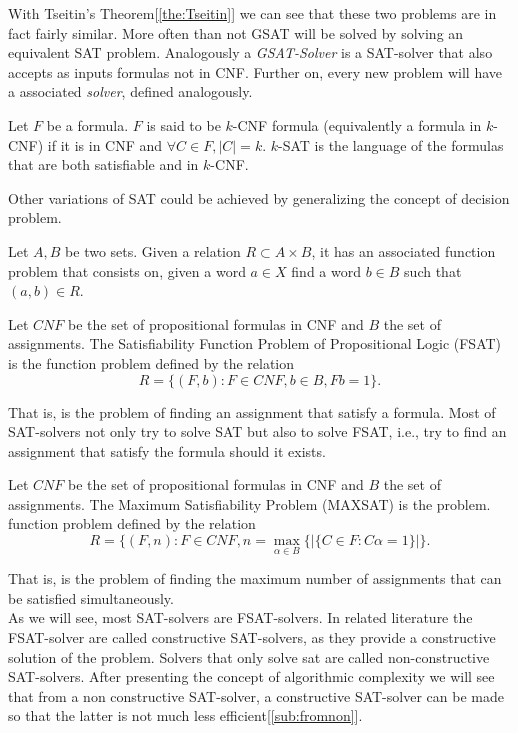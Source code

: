 With Tseitin's Theorem[\ref{the:Tseitin}] we can see that these two problems are in fact fairly similar. More often than not GSAT will be solved by solving an equivalent SAT problem. Analogously a \emph{GSAT-Solver}  is a SAT-solver that also accepts as inputs formulas not in CNF. Further on, every new problem will have a associated \emph{solver}, defined analogously.



\begin{definition}
  Let $F$ be a formula. $F$ is said to be $k$-CNF formula (equivalently a formula in $k$-CNF) if it is in CNF and $\forall C \in F, |C| = k$. $k$-SAT is the language of the formulas that are both satisfiable and in $k$-CNF.
\end{definition}

Other variations of SAT could be achieved by generalizing the concept of decision problem.

\begin{definition}
  Let $A,B$ be two sets. Given a relation $R\subset A\times B$, it has an associated function problem that consists on, given a word $a\in X$ find a word $b\in B$ such that $(a,b)\in R$.
\end{definition}

\begin{definition}
  Let $CNF$ be the set of propositional formulas in CNF and $B$ the set of assignments.  The Satisfiability Function Problem of Propositional Logic (FSAT) is the function problem defined by the relation $$R=\{(F, b): F\in CNF, b \in B, Fb = 1\}.$$
\end{definition}
That is, is the problem of finding an assignment that satisfy a formula. Most of SAT-solvers not only try to solve SAT but also to solve FSAT, i.e., try to find an assignment that satisfy  the formula should it exists.
\begin{definition}
  Let $CNF$ be the set of propositional formulas in CNF and $B$ the set of assignments. The Maximum Satisfiability Problem (MAXSAT) is the problem. function problem defined by the relation $$R=\{(F,n) : F\in CNF, n = \max_{\alpha \in B}\{ | \{C\in F : C\alpha =1 \}| \}.$$
\end{definition}

That is, is the problem of finding the maximum number of assignments that can be satisfied simultaneously.\\

As we will see, most SAT-solvers are FSAT-solvers. In related literature the FSAT-solver are called constructive SAT-solvers, as they provide a constructive solution of the problem. Solvers that only solve sat are called non-constructive SAT-solvers. After presenting the concept of algorithmic complexity we will see that from a non constructive SAT-solver, a constructive SAT-solver can be made so that the latter is not much less efficient[\ref{sub:fromnon}].

